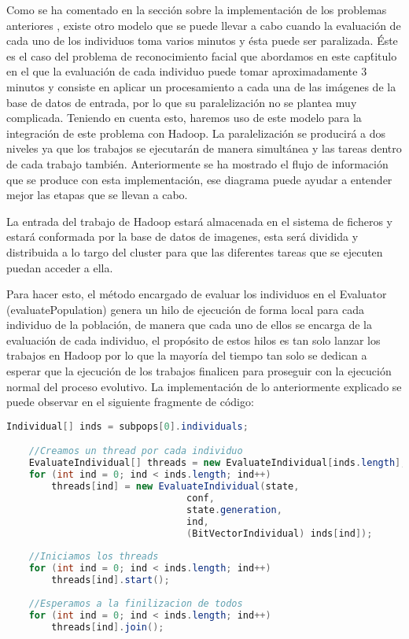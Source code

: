 Como se ha comentado en la sección sobre la implementación de los problemas anteriores , existe otro modelo que se puede llevar a cabo cuando la evaluación de cada uno de los individuos toma varios minutos y \'esta puede ser paralizada. \'Este es el caso del problema de reconocimiento facial que abordamos en este cap\'titulo en el que la evaluación de cada individuo puede tomar aproximadamente 3 minutos y consiste en aplicar un procesamiento a cada una de las imágenes de la base de datos de entrada, por lo que su paralelizaci\'on no se plantea muy complicada. Teniendo en cuenta esto, haremos uso de este modelo para la integraci\'on de este problema con Hadoop. La paralelizaci\'on se producirá a dos niveles ya que los trabajos se ejecutar\'an de manera simultánea y las tareas dentro de cada trabajo también. Anteriormente  se ha mostrado el flujo de información que se produce con esta implementación, ese diagrama puede ayudar a entender mejor las etapas que se llevan a cabo.

La entrada del trabajo de Hadoop estar\'a almacenada en el sistema de ficheros y estar\'a conformada por la base de datos de imagenes, esta ser\'a dividida y distribuida a lo targo del cluster para que las diferentes tareas que se ejecuten puedan acceder a ella.

Para hacer esto, el método encargado de evaluar los individuos en el Evaluator (evaluatePopulation) genera un hilo de ejecución de forma local para cada individuo de la poblaci\'on, de manera que cada uno de ellos se encarga de la evaluación de cada individuo, el propósito de estos hilos es tan solo lanzar los trabajos en Hadoop por lo que la mayoría del tiempo tan solo se dedican a esperar que la ejecución de los trabajos finalicen para proseguir con la ejecución normal del proceso evolutivo. La implementación de lo anteriormente explicado se puede observar en el siguiente fragmente de código:

\begin{lstlisting}[language=Java]
	Individual[] inds = subpops[0].individuals;

	//Creamos un thread por cada individuo
	EvaluateIndividual[] threads = new EvaluateIndividual[inds.length];
	for (int ind = 0; ind < inds.length; ind++)
		threads[ind] = new EvaluateIndividual(state, 
								conf, 
								state.generation, 
								ind, 
								(BitVectorIndividual) inds[ind]);
			
	//Iniciamos los threads
	for (int ind = 0; ind < inds.length; ind++)
		threads[ind].start();
			
	//Esperamos a la finilizacion de todos
	for (int ind = 0; ind < inds.length; ind++)
		threads[ind].join();
\end{lstlisting}

